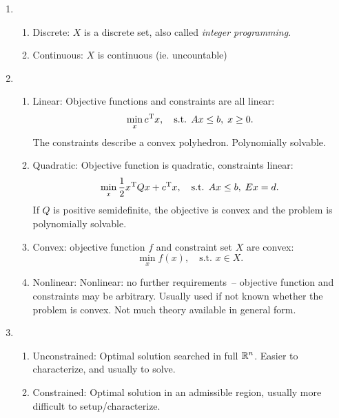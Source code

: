 \documentclass{article}
\begin{document}
\begin{enumerate}
\item
  \begin{enumerate}
  \item Discrete: \(X\) is a discrete set, also called \emph{integer programming}.
  \item Continuous: \(X\) is continuous (ie. uncountable)
  \end{enumerate}
\item
  \begin{enumerate}
  \item Linear: Objective functions and constraints are all linear:
    \begin{equation*}
      \min_x c^{\mathrm{T}} x, \quad\text{s.t. } Ax \leq b,\; x \geq 0.
    \end{equation*}
    The constraints describe a convex polyhedron.  Polynomially solvable.
  \item Quadratic: Objective function is quadratic, constraints linear:
    \begin{equation*}
      \min_x \frac{1}{2}x^{\mathrm{T}} Q x + c^{\mathrm{T}} x, \quad\text{s.t. } Ax \leq b,\; Ex = d.
    \end{equation*}
    If \(Q\) is positive semidefinite, the objective is convex and the problem is polynomially
    solvable.
  \item Convex: objective function \(f\) and constraint set \(X\) are convex:
    \begin{equation*}
      \min_x f(x), \quad\text{s.t. } x \in X.
    \end{equation*}
  \item Nonlinear: Nonlinear: no further requirements~-- objective function and constraints may be
    arbitrary.  Usually used if not known whether the problem is convex.  Not much theory available
    in general form.
  \end{enumerate}
\item
  \begin{enumerate}
  \item Unconstrained: Optimal solution searched in full \(\mathbb{R}^n\). Easier to characterize, and
    usually to solve.
  \item Constrained: Optimal solution in an admissible region, usually more difficult to
    setup/characterize.
  \end{enumerate}
\end{enumerate}


\label{s:local-global-minima}
\end{document}
